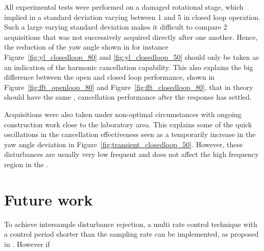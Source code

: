 All experimental tests were performed on a damaged rotational stage, which implied in a standard deviation varying between \unit{1}{\micro\radian} and \unit{5}{\micro\radian} in closed loop operation. Such a large varying standard deviation makes it difficult to compare 2 acquisitions that was not successively acquired directly after one another. Hence, the reduction of the yaw angle shown in for instance Figure~\ref{fig:yl_closedloop_80} and \ref{fig:yl_closedloop_50} should only be taken as an indication of the harmonic cancellation capability. This also explains the big difference between the open and closed loop performance, shown in Figure~\ref{fig:fft_openloop_80} and Figure~\ref{fig:fft_closedloop_80}, that in theory should have the same , cancellation performance after the response has settled.

Acquisitions were also taken under non-optimal circumstances with ongoing construction work close to the laboratory area. This explains some of the quick oscillations in the cancellation effectiveness seen as a temporarily increase in the yaw angle deviation in Figure~\ref{fig:transient_closedloop_50}. However, these disturbances are usually very low frequent and does not affect the high frequency region in the \abbrFFT.



\section{Future work}

To achieve intersample disturbance rejection, a multi rate control technique with a control period shorter than the sampling rate can be implemented, as proposed in \citep{fujimoto2009rro}. However if
